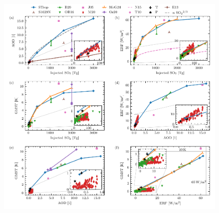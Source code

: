\documentclass[draft]{agujournal2019}
\begin{document}
  \begin{figure}
    \centering \includegraphics[width=\textwidth]{figure4}


\end{figure}
\end{document}
